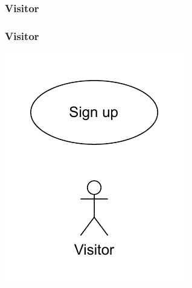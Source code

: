 \documentclass{beamer}
\begin{document}
\subsubsection*{Visitor}

\begin{frame}
    \frametitle{Visitor}
    \centering
    \includegraphics[width=0.3\linewidth]{drawio/visitor.pdf}
\end{frame}




\end{document}
